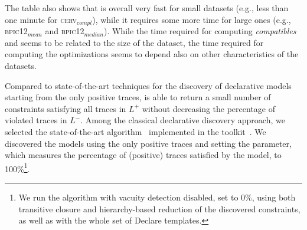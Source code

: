 The table also shows that \nd is overall very fast for small datasets (e.g., less than one minute for \textsc{cerv$_{compl}$}), while it requires some more time for large ones (e.g., \textsc{bpic12$_{mean}$} and \textsc{bpic12$_{median}$}). While the time required for computing \textit{compatibles} and \textit{\sheriff} seems to be related to the size of the dataset, the time required for computing the optimizations seems to depend also on other characteristics of the datasets. 



Compared to state-of-the-art techniques for the discovery of declarative models starting from the only positive traces, \nd is able to return a small number of constraints satisfying all traces in $L^+$ without decreasing the percentage of violated traces in $L^-$.  
Among the classical declarative discovery approach, we selected the state-of-the-art \declareminer algorithm~\cite{2018a-Maggi} implemented in the \rum toolkit~\cite{2020-Alman}. We discovered the models using the only positive traces and setting the  parameter, which measures the percentage of (positive) traces satisfied by the \declare model, to 100\%\footnote{We run the \declareminer algorithm with vacuity detection disabled,  set to 0\%, using both transitive closure and hierarchy-based reduction of the discovered constraints, as well as with the whole set of Declare templates.}.

